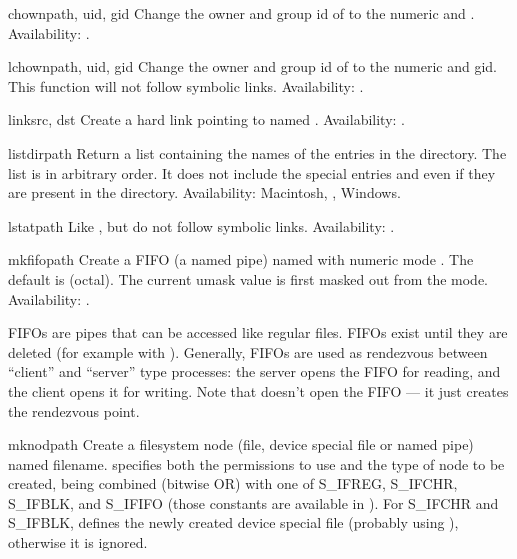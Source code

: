 \begin{funcdesc}{chown}{path, uid, gid}
Change the owner and group id of  to the numeric 
and .
Availability: \UNIX.
\end{funcdesc}

\begin{funcdesc}{lchown}{path, uid, gid}
Change the owner and group id of  to the numeric 
and gid. This function will not follow symbolic links.
Availability: \UNIX.
\end{funcdesc}

\begin{funcdesc}{link}{src, dst}
Create a hard link pointing to  named .
Availability: \UNIX.
\end{funcdesc}

\begin{funcdesc}{listdir}{path}
Return a list containing the names of the entries in the directory.
The list is in arbitrary order.  It does not include the special
entries  and  even if they are present in the
directory.
Availability: Macintosh, \UNIX, Windows.

\end{funcdesc}

\begin{funcdesc}{lstat}{path}
Like , but do not follow symbolic links.
Availability: \UNIX.
\end{funcdesc}

\begin{funcdesc}{mkfifo}{path}
Create a FIFO (a named pipe) named  with numeric mode
.  The default  is  (octal).  The current
umask value is first masked out from the mode.
Availability: \UNIX.

FIFOs are pipes that can be accessed like regular files.  FIFOs exist
until they are deleted (for example with ).
Generally, FIFOs are used as rendezvous between ``client'' and
``server'' type processes: the server opens the FIFO for reading, and
the client opens it for writing.  Note that 
doesn't open the FIFO --- it just creates the rendezvous point.
\end{funcdesc}

\begin{funcdesc}{mknod}{path}
Create a filesystem node (file, device special file or named pipe)
named filename.  specifies both the permissions to use and
the type of node to be created, being combined (bitwise OR) with one
of S_IFREG, S_IFCHR, S_IFBLK, and S_IFIFO (those constants are
available in ). For S_IFCHR and S_IFBLK, 
defines the newly created device special file (probably using
), otherwise it is ignored.
\end{funcdesc}

